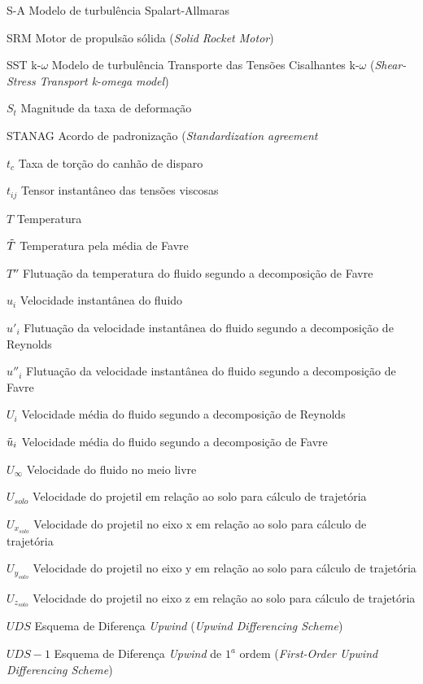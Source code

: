 \begin{siglas}
    \item[S-A] Modelo de turbulência Spalart-Allmaras
    \item[SRM] Motor de propulsão sólida (\textit{Solid Rocket Motor})
    \item[SST k-$\omega$] Modelo de turbulência Transporte das Tensões Cisalhantes k-$\omega$ (\textit{Shear-Stress Transport k-omega model})
    \item[$S_t$] Magnitude da taxa de deformação
    \item[STANAG] Acordo de padronização (\textit{Standardization agreement}
    \item[$t_c$] Taxa de torção do canhão de disparo
    \item[$t_{ij}$] Tensor instantâneo das tensões viscosas
    \item[$T$] Temperatura
    \item[$\Tilde{T}$] Temperatura pela média de Favre
    \item[$T''$] Flutuação da temperatura do fluido segundo a decomposição de Favre
    \item[$u_i$] Velocidade instantânea do fluido
    \item[$u'_i$] Flutuação da velocidade instantânea do fluido segundo a decomposição de Reynolds
    \item[$u''_i$] Flutuação da velocidade instantânea do fluido segundo a decomposição de Favre
    \item[$U_i$] Velocidade média do fluido segundo a decomposição de Reynolds
    \item[$\Tilde{u}_i$] Velocidade média do fluido segundo a decomposição de Favre
    \item[$U_\infty$] Velocidade do fluido no meio livre
    \item[$U_{solo}$] Velocidade do projetil em relação ao solo para cálculo de trajetória
    \item[$U_{x_{solo}}$] Velocidade do projetil no eixo x em relação ao solo para cálculo de trajetória
    \item[$U_{y_{solo}}$] Velocidade do projetil no eixo y em relação ao solo para cálculo de trajetória
    \item[$U_{z_{solo}}$] Velocidade do projetil no eixo z em relação ao solo para cálculo de trajetória
    \item[$UDS$] Esquema de Diferença \textit{Upwind} (\textit{Upwind Differencing Scheme})
    \item[$UDS-1$] Esquema de Diferença \textit{Upwind} de $1^a$ ordem (\textit{First-Order Upwind Differencing Scheme})

\end{siglas}

